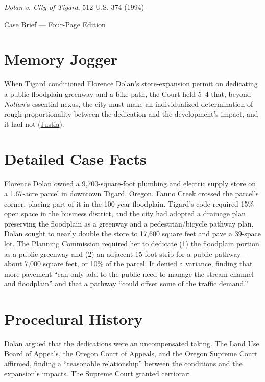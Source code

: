 \documentclass[12pt]{article}
\begin{document}
\begin{center}
{\LARGE \textit{Dolan v. City of Tigard}, 512 U.S. 374 (1994)\par}
\vspace{0.8em}
{\large Case Brief --- Four-Page Edition\par}
\end{center}
\vspace{1em}

\section{Memory Jogger}

When Tigard conditioned Florence Dolan's store-expansion permit on dedicating a public floodplain greenway and a bike path, the Court held 5--4 that, beyond \textit{Nollan}'s essential nexus, the city must make an individualized determination of rough proportionality between the dedication and the development's impact, and it had not (\href{https://supreme.justia.com/cases/federal/us/512/374/}{Justia}).

\section{Detailed Case Facts}

Florence Dolan owned a 9,700-square-foot plumbing and electric supply store on a 1.67-acre parcel in downtown Tigard, Oregon. Fanno Creek crossed the parcel's corner, placing part of it in the 100-year floodplain. Tigard's code required 15\% open space in the business district, and the city had adopted a drainage plan preserving the floodplain as a greenway and a pedestrian/bicycle pathway plan. Dolan sought to nearly double the store to 17,600 square feet and pave a 39-space lot. The Planning Commission required her to dedicate (1) the floodplain portion as a public greenway and (2) an adjacent 15-foot strip for a public pathway---about 7,000 square feet, or 10\% of the parcel. It denied a variance, finding that more pavement ``can only add to the public need to manage the stream channel and floodplain'' and that a pathway ``could offset some of the traffic demand.''

\section{Procedural History}

Dolan argued that the dedications were an uncompensated taking. The Land Use Board of Appeals, the Oregon Court of Appeals, and the Oregon Supreme Court affirmed, finding a ``reasonable relationship'' between the conditions and the expansion's impacts. The Supreme Court granted certiorari.
\end{document}
